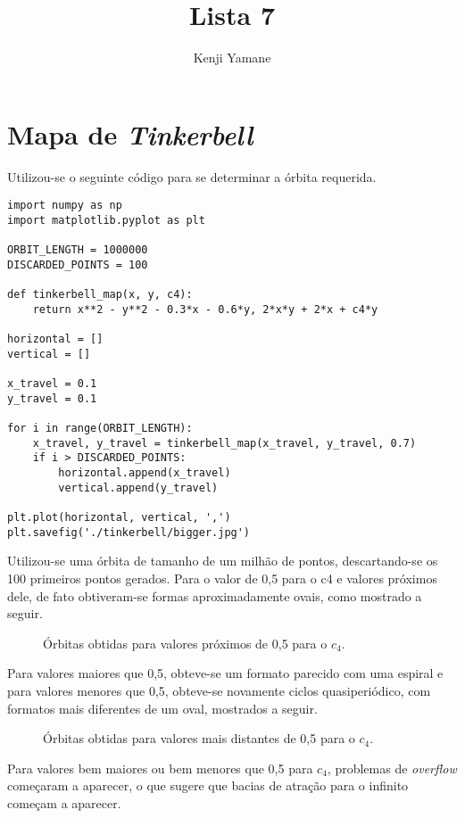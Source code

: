 \documentclass{article}[twocolumn]
\title{Lista 7}
\author{Kenji Yamane}
\begin{document}
	\maketitle
	\section{Mapa de \textit{Tinkerbell}}
	Utilizou-se o seguinte c\'odigo para se determinar a \'orbita requerida.
	\begin{verbatim}
import numpy as np
import matplotlib.pyplot as plt

ORBIT_LENGTH = 1000000
DISCARDED_POINTS = 100

def tinkerbell_map(x, y, c4):
    return x**2 - y**2 - 0.3*x - 0.6*y, 2*x*y + 2*x + c4*y

horizontal = []
vertical = []

x_travel = 0.1
y_travel = 0.1

for i in range(ORBIT_LENGTH):
    x_travel, y_travel = tinkerbell_map(x_travel, y_travel, 0.7)
    if i > DISCARDED_POINTS:
        horizontal.append(x_travel)
        vertical.append(y_travel)

plt.plot(horizontal, vertical, ',')
plt.savefig('./tinkerbell/bigger.jpg')

	\end{verbatim}
	Utilizou-se uma \'orbita de tamanho de um milh\~ao de pontos, descartando-se os 100
	primeiros pontos gerados. Para o valor de 0,5 para o c4 e valores pr\'oximos dele,
	de fato obtiveram-se formas aproximadamente ovais, como mostrado a seguir.
	\begin{figure}[H]
		\centering
		\caption{\'Orbitas obtidas para valores pr\'oximos de 0,5 para o $c_{4}$.}
	\end{figure}
	Para valores maiores que 0,5, obteve-se um formato parecido com uma espiral e para valores
	menores que 0,5, obteve-se novamente ciclos quasiperi\'odico, com formatos mais diferentes
	de um oval, mostrados a seguir.
	\begin{figure}[H]
		\centering
		\caption{\'Orbitas obtidas para valores mais distantes de 0,5 para o $c_{4}$.}
	\end{figure}
	Para valores bem maiores ou bem menores que 0,5 para $c_{4}$, problemas de
	\textit{overflow} come\c{c}aram a aparecer, o que sugere que bacias de atra\c{c}\~ao para
	o infinito come\c{c}am a aparecer.
\end{document}
